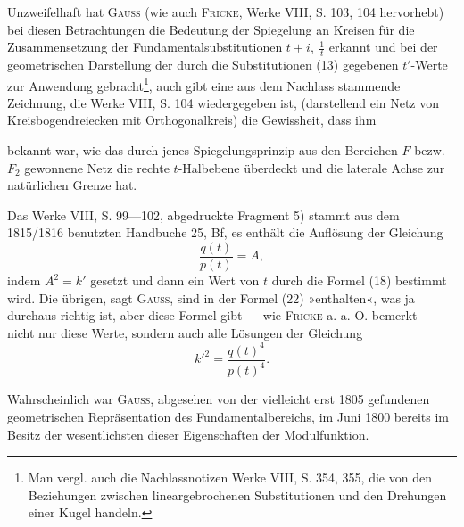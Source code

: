 Unzweifelhaft hat \textsc{Gauss} (wie auch \textsc{Fricke}, Werke VIII, S. 103, 104 hervorhebt)
bei diesen Betrachtungen die Bedeutung der Spiegelung an Kreisen
für die Zusammensetzung der Fundamentalsubstitutionen \(t+i,\ \frac1t\) erkannt und bei
der geometrischen Darstellung der durch die Substitutionen (13) gegebenen
\(t'\)-Werte zur Anwendung gebracht\footnote{Man vergl. auch die Nachlassnotizen Werke VIII, S. 354, 355, die von den Beziehungen zwischen lineargebrochenen Substitutionen und den Drehungen einer Kugel handeln.}, auch gibt eine aus dem Nachlass stammende
Zeichnung, die Werke VIII, S. 104 wiedergegeben ist, (darstellend ein
Netz von Kreisbogendreiecken mit Orthogonalkreis) die Gewissheit, dass ihm\par
\clearpage{}
\noindent bekannt war, wie das durch jenes Spiegelungsprinzip aus den Bereichen \(F\)
bezw. \(F_2\) gewonnene Netz die rechte \(t\)-Halbebene überdeckt und die laterale
Achse zur natürlichen Grenze hat.

Das Werke VIII, S. 99—102, abgedruckte Fragment 5) stammt aus dem
1815/1816 benutzten Handbuche 25, Bf, es enthält die Auflösung der Gleichung
\[
\frac{q(t)}{p(t)}=A,
\]
\noindent indem \(A^2=k'\) gesetzt und dann ein Wert von \(t\) durch die Formel (18) bestimmt
wird. Die übrigen, sagt \textsc{Gauss}, sind in der Formel (22) »enthalten«,
was ja durchaus richtig ist, aber diese Formel gibt — wie \textsc{Fricke} a. a. O.
bemerkt — nicht nur diese Werte, sondern auch alle Lösungen der Gleichung
\[
k'^2=\frac{q(t)^4}{p(t)^4}.
\]

Wahrscheinlich war \textsc{Gauss}, abgesehen von der vielleicht erst 1805 gefundenen
geometrischen Repräsentation des Fundamentalbereichs, im Juni 1800
bereits im Besitz der wesentlichsten dieser Eigenschaften der Modulfunktion.
